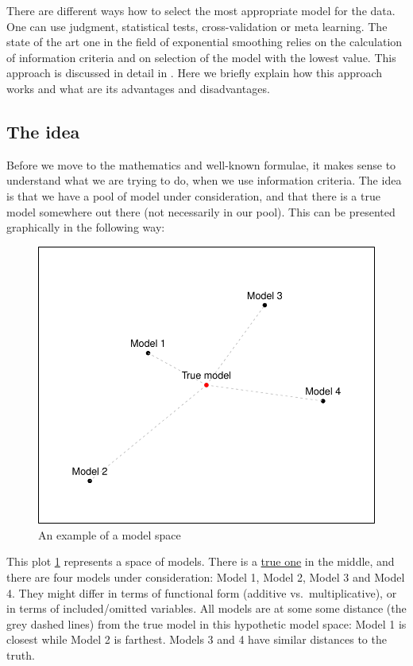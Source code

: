 \documentclass[
]{book}
\theoremstyle{definition}
\theoremstyle{definition}
\theoremstyle{definition}
\theoremstyle{definition}
\theoremstyle{remark}
\begin{document}
There are different ways how to select the most appropriate model for the data. One can use judgment, statistical tests, cross-validation or meta learning. The state of the art one in the field of exponential smoothing relies on the calculation of information criteria and on selection of the model with the lowest value. This approach is discussed in detail in \citet{Burnham2004}. Here we briefly explain how this approach works and what are its advantages and disadvantages.

\hypertarget{informationCriteriaIdea}{%
\subsection{The idea}\label{informationCriteriaIdea}}

Before we move to the mathematics and well-known formulae, it makes sense to understand what we are trying to do, when we use information criteria. The idea is that we have a pool of model under consideration, and that there is a true model somewhere out there (not necessarily in our pool). This can be presented graphically in the following way:

\begin{figure}
\centering
\includegraphics{Svetunkov---Statistics-for-Business-Analytics_files/figure-latex/AICModelsPlot-1.pdf}
\caption{\label{fig:AICModelsPlot}An example of a model space}
\end{figure}

This plot \ref{fig:AICModelsPlot} represents a space of models. There is a \protect\hyperlink{intro}{true one} in the middle, and there are four models under consideration: Model 1, Model 2, Model 3 and Model 4. They might differ in terms of functional form (additive vs.~multiplicative), or in terms of included/omitted variables. All models are at some some distance (the grey dashed lines) from the true model in this hypothetic model space: Model 1 is closest while Model 2 is farthest. Models 3 and 4 have similar distances to the truth.
\end{document}
